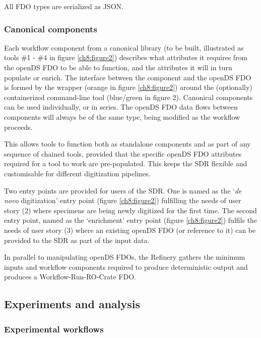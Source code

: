 All FDO types are serialized as JSON.

\subsubsection{Canonical components}\label{canonical-components}

Each workflow component from a canonical library (to be built,
illustrated as tools \#1 - \#4 in figure \ref{ch8:figure2}) describes what attributes it
requires from the openDS FDO to be able to function, and the attributes
it will in turn populate or enrich. The interface between the component
and the openDS FDO is formed by the wrapper (orange in figure \ref{ch8:figure2}) around
the (optionally) containerized command-line tool (blue/green in figure
2). Canonical components can be used individually, or in series. The
openDS FDO data flows between components will always be of the same
type, being modified as the workflow proceeds.

This allows tools to function both as standalone components and as part
of any sequence of chained tools, provided that the specific openDS FDO
attributes required for a tool to work are pre-populated. This keeps the
SDR flexible and customisable for different digitization pipelines.

Two entry points are provided for users of the SDR. One is named as the
`\emph{de novo} digitization' entry point (figure \ref{ch8:figure2}) fulfilling the
needs of user story (2) where specimens are being newly digitized for
the first time. The second entry point, named as the `enrichment' entry
point (figure \ref{ch8:figure2}) fulfils the needs of user story (3) where an existing
openDS FDO (or reference to it) can be provided to the SDR as part of
the input data.

In parallel to manipulating openDS FDOs, the Refinery gathers the
minimum inputs and workflow components required to produce deterministic
output and produces a Workflow-Run-RO-Crate FDO.

\subsection{Experiments and analysis}\label{experiments-and-analysis}

\subsubsection{Experimental workflows}\label{experimental-workflows}

